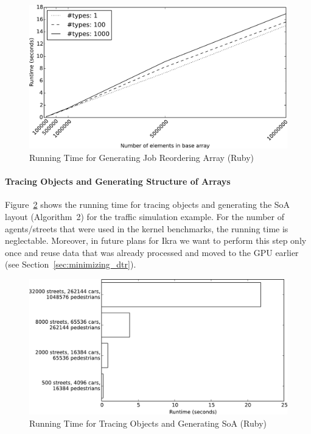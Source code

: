 \documentclass[preprint]{sigplanconf}
\begin{document}
\begin{figure}[!htp]
    \includegraphics[width=\columnwidth]{plot_reorder.pdf}
    \centering
    \caption{Running Time for Generating Job Reordering Array (Ruby)}
    \label{fig:job_reorder_arr}
\end{figure}

\paragraph{Tracing Objects and Generating Structure of Arrays}
Figure~\ref{fig:tracing} shows the running time for tracing objects and generating the SoA layout (Algorithm~2) for the traffic simulation example. For the number of agents/streets that were used in the kernel benchmarks, the running time is neglectable. Moreover, in future plans for Ikra we want to perform this step only once and reuse data that was already processed and moved to the GPU earlier (see Section~\ref{sec:minimizing_dtr}).

\begin{figure}[!htp]
    \includegraphics[width=\columnwidth]{obj_tracer.pdf}
    \centering
    \caption{Running Time for Tracing Objects and Generating SoA (Ruby)}
    \label{fig:tracing}
\end{figure}
\end{document}
